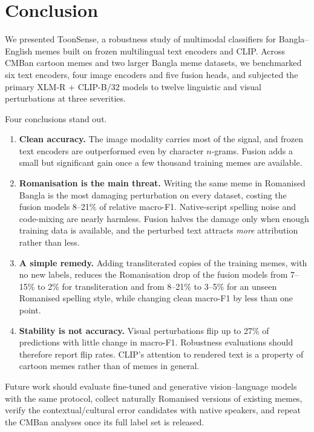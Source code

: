 \section{Conclusion}
\label{sec:conclusion}

We presented ToonSense, a robustness study of multimodal classifiers for Bangla--English memes built on frozen
multilingual text encoders and CLIP. Across CMBan cartoon memes and two larger Bangla meme datasets, we benchmarked
six text encoders, four image encoders and five fusion heads, and subjected the primary XLM-R + CLIP-B/32 models to
twelve linguistic and visual perturbations at three severities.

Four conclusions stand out.
\begin{enumerate}
  \item \textbf{Clean accuracy.} The image modality carries most of the signal, and frozen text encoders are
  outperformed even by character $n$-grams. Fusion adds a small but significant gain once a few thousand training
  memes are available.

  \item \textbf{Romanisation is the main threat.} Writing the same meme in Romanised Bangla is the most damaging
  perturbation on every dataset, costing the fusion models 8--21\% of relative macro-F1. Native-script spelling
  noise and code-mixing are nearly harmless. Fusion halves the damage only when enough training data is
  available, and the perturbed text attracts \emph{more} attribution rather than less.

  \item \textbf{A simple remedy.} Adding transliterated copies of the training memes, with no new labels, reduces the Romanisation drop of
  the fusion models from 7--15\% to 2\% for transliteration and from 8--21\% to 3--5\% for an unseen
  Romanised spelling style, while changing clean macro-F1 by less than one point.

  \item \textbf{Stability is not accuracy.} Visual perturbations flip up to 27\% of predictions with little change
  in macro-F1. Robustness evaluations should therefore report flip rates. CLIP's attention to rendered text is a
  property of cartoon memes rather than of memes in general.
\end{enumerate}

Future work should evaluate fine-tuned and generative vision--language models with the same protocol, collect
naturally Romanised versions of existing memes, verify the contextual/cultural error candidates with native
speakers, and repeat the CMBan analyses once its full label set is released.
